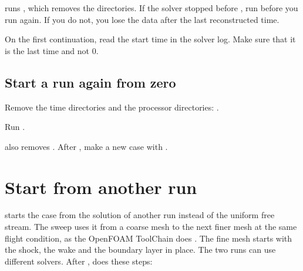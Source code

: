 \begin{caution}
 runs , which removes the 
directories. If the solver stopped before , run
 before you run  again. If you do not,
you lose the data after the last reconstructed time.
\end{caution}

On the first continuation, read the start time in the solver log. Make sure that it
is the last time and not 0.

\subsection{Start a run again from zero}

\begin{steps}
\item Remove the time directories and the processor directories:
  .
\item Run .
\end{steps}

 also removes . After , make a
new case with .

\section{Start from another run}\label{sec:init}

 starts the case from the solution of another run
instead of the uniform free stream. The sweep uses it from a coarse mesh to the next
finer mesh at the same flight condition, as the OpenFOAM ToolChain does
\citep[§5.4]{toolchain2026}. The fine mesh starts with the shock, the wake and the
boundary layer in place. The two runs can use different solvers. After
,  does these steps:

